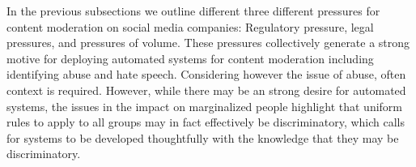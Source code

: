 In the previous subsections we outline different three different pressures for content moderation on social media companies: Regulatory pressure, legal pressures, and pressures of volume. These pressures collectively generate a strong motive for deploying automated systems for content moderation including identifying abuse and hate speech. Considering however the issue of abuse, often context is required. However, while there may be an strong desire for automated systems, the issues in the impact on marginalized people highlight that uniform rules to apply to all groups may in fact effectively be discriminatory, which calls for systems to be developed thoughtfully with the knowledge that they may be discriminatory.


